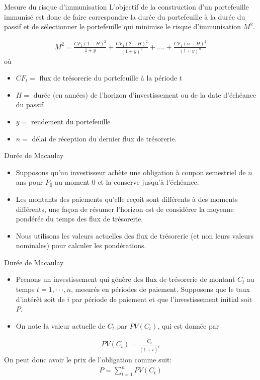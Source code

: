 \documentclass{beamer}
\begin{document}
\begin{frame}{Mesure du risque d'immunisation}
L'objectif de la construction d'un portefeuille immunisé est donc de faire correspondre la durée du portefeuille à la durée du passif et de sélectionner le portefeuille qui minimise le risque d'immunisation $M^2$.

\begin{align*}
M^2=\frac{CF_1 (1-H)^2}{1+y}+\frac{CF_1 (2-H)^2}{(1+y)^2}+....+\frac{CF_1 (n-H)^2}{(1+y)^n}
\end{align*}
où 
\begin{itemize}[label=\bullet]
\item $CF_t =$ flux de trésorerie du portefeuille à la période t
\item $H =$ durée (en années) de l'horizon d'investissement ou de la date d'échéance du passif
\item $y =$ rendement du portefeuille 
\item $n =$ délai de réception du dernier flux de trésorerie.
\end{itemize}
\end{frame}

\begin{frame}{Durée de Macaulay}
\begin{itemize}[label=\bullet]
\item Supposons qu'un investisseur achète une obligation à coupon semestriel de $n$ ans pour $P_0$ au moment $0$ et la conserve jusqu'à l'échéance.
\item Les montants des paiements qu'elle reçoit sont différents à des moments différents, une façon de résumer l'horizon est de considérer la moyenne pondérée du temps des flux de trésorerie.
\item Nous utilisons les valeurs actuelles des flux de trésorerie (et non leurs valeurs nominales) pour calculer les pondérations.
\end{itemize}
\end{frame}


\begin{frame}{Durée de Macaulay}
\begin{itemize}[label=\bullet]
\item Prenons un investissement qui génère des flux de trésorerie de montant $C_t$ au temps $t = 1, · · ·, n$,  mesurés en périodes de paiement. Supposons que le taux d'intérêt soit de $i$ par période de paiement et que l'investissement initial soit $P$.
\item On note la valeur actuelle de $C_t$ par $PV(C_t)$, qui est donnée par
\end{itemize}
\begin{align*}
PV(C_t)=\frac{C_t}{(1+i)^t}
\end{align*}
On peut donc avoir le prix de l'obligation comme suit:
\begin{align*}
P=\sum_{t=1}^n PV(C_t)
\end{align*}
\end{frame}
\end{document}
